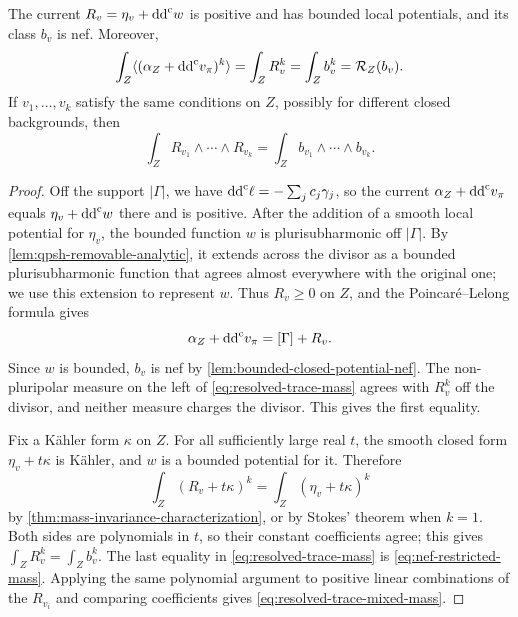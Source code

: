 \begin{lemma}\label{lem:bounded-residual-mass-polynomial}
The current $R_v=\eta_v+\mathrm{dd}^{\mathrm{c}} w$ is positive and has bounded local potentials, and its class $b_v$ is nef. Moreover,
\begin{equation}\label{eq:resolved-trace-mass}
 \int_Z\langle(\alpha_Z+\mathrm{dd}^{\mathrm{c}} v_\pi)^k\rangle
       =\int_ZR_v^k
       =\int_Zb_v^k
       =\mathcal R_Z(b_v).
\end{equation}
If $v_1,\ldots,v_k$ satisfy the same conditions on $Z$, possibly for different closed backgrounds, then
\begin{equation}\label{eq:resolved-trace-mixed-mass}
 \int_ZR_{v_1}\wedge\cdots\wedge R_{v_k}
       =\int_Zb_{v_1}\wedge\cdots\wedge b_{v_k}.
\end{equation}
\end{lemma}
\begin{proof}
Off the support $|\Gamma|$, we have $\mathrm{dd}^{\mathrm{c}}\ell=-\sum_jc_j\gamma_j$, so the current $\alpha_Z+\mathrm{dd}^{\mathrm{c}} v_\pi$ equals $\eta_v+\mathrm{dd}^{\mathrm{c}} w$ there and is positive. After the addition of a smooth local potential for $\eta_v$, the bounded function $w$ is plurisubharmonic off $|\Gamma|$. By \cref{lem:qpsh-removable-analytic}, it extends across the divisor as a bounded plurisubharmonic function that agrees almost everywhere with the original one; we use this extension to represent $w$. Thus $R_v\geq0$ on $Z$, and the Poincar\'e--Lelong formula gives
\[
 \alpha_Z+\mathrm{dd}^{\mathrm{c}} v_\pi=[\Gamma]+R_v.
\]
Since $w$ is bounded, $b_v$ is nef by \cref{lem:bounded-closed-potential-nef}. The non-pluripolar measure on the left of \eqref{eq:resolved-trace-mass} agrees with $R_v^k$ off the divisor, and neither measure charges the divisor. This gives the first equality.

Fix a K\"ahler form $\kappa$ on $Z$. For all sufficiently large real $t$, the smooth closed form $\eta_v+t\kappa$ is K\"ahler, and $w$ is a bounded potential for it. Therefore
\[
 \int_Z(R_v+t\kappa)^k=\int_Z(\eta_v+t\kappa)^k
\]
by \cref{thm:mass-invariance-characterization}, or by Stokes' theorem when $k=1$. Both sides are polynomials in $t$, so their constant coefficients agree; this gives $\int_ZR_v^k=\int_Zb_v^k$. The last equality in \eqref{eq:resolved-trace-mass} is \eqref{eq:nef-restricted-mass}. Applying the same polynomial argument to positive linear combinations of the $R_{v_i}$ and comparing coefficients gives \eqref{eq:resolved-trace-mixed-mass}.
\end{proof}

